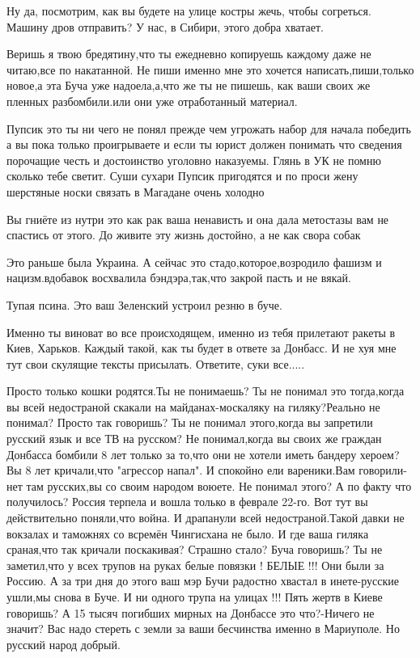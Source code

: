 Ну да, посмотрим, как вы будете на улице костры жечь, чтобы согреться. Машину
дров отправить? У нас, в Сибири, этого добра хватает.


Веришь я твою бредятину,что ты ежедневно копируешь каждому даже не читаю,все по
накатанной. Не пиши именно мне это хочется написать,пиши,только новое,а эта
Буча уже надоела,а,что же ты не пишешь, как ваши своих же пленных
разбомбили.или они уже отработанный материал.


Пупсик это ты ни чего не понял прежде чем угрожать набор для начала победить а
вы пока только проигрываете и если ты юрист должен понимать что сведения
порочащие честь и достоинство уголовно наказуемы. Глянь в УК не помню сколько
тебе светит. Суши сухари Пупсик пригодятся и по проси жену шерстяные носки
связать в Магадане очень холодно


Вы гниёте из нутри это как рак ваша ненависть и она дала метостазы вам не
спастись от этого. До живите эту жизнь достойно, а не как свора собак


Это раньше была Украина. А сейчас это стадо,которое,возродило фашизм и
нацизм.вдобавок восхвалила бэндэра,так,что закрой пасть и не вякай.


Тупая псина. Это ваш Зеленский устроил резню в буче.


Именно ты виноват во все происходящем, именно из тебя прилетают ракеты в Киев,
Харьков. Каждый такой, как ты будет в ответе за Донбасс. И не хуя мне тут свои
скулящие тексты присылать. Ответите, суки все.....


Просто только кошки родятся.Ты не понимаешь? Ты не понимал это тогда,когда вы
всей недостраной скакали на майданах-москаляку на гиляку?Реально не понимал?
Просто так говоришь? Ты не понимал этого,когда вы запретили русский язык и все
ТВ на русском? Не понимал,когда вы своих же граждан Донбасса бомбили 8 лет
только за то,что они не хотели иметь бандеру хероем? Вы 8 лет кричали,что
"агрессор напал". И спокойно ели вареники.Вам говорили-нет там русских,вы со
своим народом воюете. Не понимал этого? А по факту что получилось? Россия
терпела и вошла только в феврале 22-го. Вот тут вы действительно поняли,что
война. И драпанули всей недостраной.Такой давки не вокзалах и таможнях со
всремён Чингисхана не было. И где ваша гиляка сраная,что так кричали
поскакивая? Страшно стало? Буча говоришь? Ты не заметил,что у всех трупов на
руках белые повязки ! БЕЛЫЕ !!! Они были за Россию. А за три дня до этого ваш
мэр Бучи радостно хвастал в инете-русские ушли,мы снова в Буче. И ни одного
трупа на улицах !!! Пять жертв в Киеве говоришь? А 15 тысяч погибших мирных на
Донбассе это что?-Ничего не значит? Вас надо стереть с земли за ваши бесчинства
именно в Мариуполе. Но русский народ добрый.

